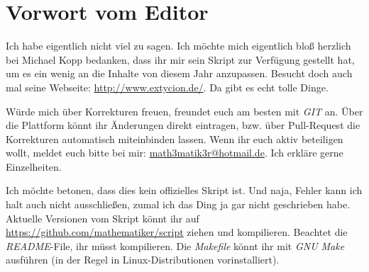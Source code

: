 \chapter{Vorwort vom Editor}

Ich habe eigentlich nicht viel zu sagen.  Ich möchte mich eigentlich bloß herzlich bei Michael Kopp bedanken, dass ihr mir sein Skript zur Verfügung gestellt hat, um es ein wenig an die Inhalte 
von diesem Jahr anzupassen. Besucht doch auch mal seine Webseite: \url{http://www.extycion.de/}.  Da gibt es echt tolle Dinge.  

Würde mich über Korrekturen freuen,  freundet euch am besten mit \emph{GIT} an. Über die Plattform könnt ihr Änderungen direkt eintragen,  bzw.  über Pull-Request die Korrekturen automatisch 
miteinbinden lassen.  Wenn ihr euch aktiv beteiligen wollt,  meldet euch bitte bei mir: \href{mailto: math3matik3r@hotmail.de}{math3matik3r@hotmail.de}. Ich erkläre gerne Einzelheiten. 

Ich möchte betonen, dass dies kein offizielles Skript ist.  Und naja,  Fehler kann ich halt auch nicht ausschließen, zumal ich das Ding ja gar nicht geschrieben habe. Aktuelle Versionen vom Skript könnt 
ihr auf \url{https://github.com/mathematiker/script} ziehen und kompilieren.  Beachtet die \emph{README}-File, ihr müsst  kompilieren.  
Die \emph{Makefile}  könnt ihr mit \emph{GNU Make} ausführen (in der Regel in Linux-Distributionen vorinstalliert).  
